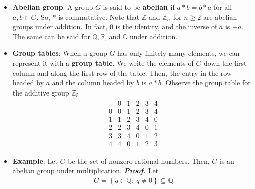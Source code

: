 \documentclass{report}
\begin{document}
\begin{itemize}
\begin{enumerate}
                \item there exists an $e \in G$ such that $a \ast e = e \ast a = a$ for all $a \in G$ (existence of identity); and
                \item for each $a \in G$, there exists a $b \in G$ such that $a \ast b = b \ast a = e$ (existence of inverses).
            \end{enumerate}
            We refer to $G$ as a group \textbf{under} $\ast$. The element $e$ is called the \textbf{identity} of the group. Also, if $b$ is the inverse of $a$, then we write $b = a^{-1}$.
        \item \textbf{Abelian group}: A group $G$ is said to be \textbf{abelian} if $a \ast b = b \ast a$ for all $a,b \in G$. So, $\ast$ is commutative.
            \bigbreak \noindent 
            Note that $ \mathbb{Z}$ and $ \mathbb{Z}_{n}$ for $n \geq 2$ are abelian groups under addition. In fact, 0 is the identity, and the inverse of $a$ is $-a$. The same can be said for $ \mathbb{Q}, \mathbb{R}$, and $\mathbb{C}$ under addition.
        \item \textbf{Group tables}: When a group $G$ has only finitely many elements, we can represent it with a \textbf{group table}. We write the elements of $G$ down the first column and along the first row of the table. Then, the entry in the row headed by $a$ and the column headed by $b$ is $a \ast b$. Observe the group table for the additive group $ \mathbb{Z}_{5} $
            \begin{align*}
                \begin{array}{c|ccccc}
                    & 0 & 1 & 2 & 3 & 4 \\
                    \hline
                    0 & 0 & 1 & 2 & 3 & 4 \\
                    1 & 1 & 2 & 3 & 4 & 0 \\
                    2 & 2 & 3 & 4 & 0 & 1 \\
                    3 & 3 & 4 & 0 & 1 & 2 \\
                    4 & 4 & 0 & 1 & 2 & 3
                \end{array}
            \end{align*}
        \item \textbf{Example}: Let $G$ be the set of nonzero rational numbers. Then, $G$ is an abelian group under multiplication.
            \bigbreak \noindent 
            \textbf{\textit{Proof.}} Let 
            \begin{align*}
                G = \left\{q \in \mathbb{Q}:\; q \ne 0\right\} \subseteq \mathbb{Q}

\end{align*}
\end{itemize}
\end{document}

